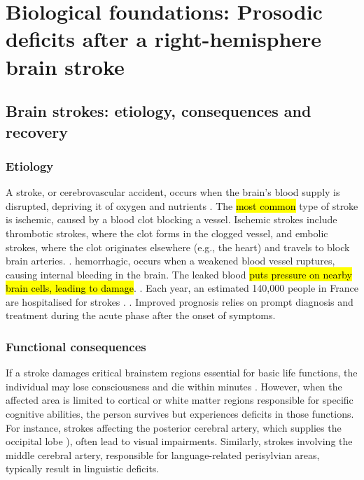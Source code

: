 \renewcommand{\chaptername}{Chapter}
\chapter{Biological foundations: Prosodic deficits after a right-hemisphere brain stroke}\label{chap2}


\section {Brain strokes: etiology, consequences and recovery}

\subsection{Etiology}

A stroke, or cerebrovascular accident, occurs when the brain's blood supply is disrupted, depriving it of oxygen and nutrients . The \hl{most common} type of stroke is ischemic, caused by a blood clot blocking a vessel. Ischemic strokes include thrombotic strokes, where the clot forms in the clogged vessel, and embolic strokes, where the clot originates elsewhere (e.g., the heart) and travels to block brain arteries. .  hemorrhagic, occurs when a weakened blood vessel ruptures, causing internal bleeding in the brain. The leaked blood \hl{puts pressure on nearby brain cells, leading to damage}.  \cite{kemmerer_cognitive_nodate}. Each year, an estimated 140,000 people in France are hospitalised for strokes \cite{lecoffre_laccident_nodate}. .  Improved prognosis relies on prompt diagnosis and treatment during the acute phase after the onset of symptoms.

\subsection{Functional consequences} 

If a stroke damages critical brainstem regions essential for basic life functions, the individual may lose consciousness and die within minutes . However, when the affected area is limited to cortical or white matter regions responsible for specific cognitive abilities, the person  survives but  experiences deficits in those functions. For instance, strokes affecting the posterior cerebral artery, which supplies the occipital lobe ), often lead to visual impairments. Similarly, strokes involving the middle cerebral artery, responsible for language-related perisylvian areas, typically result in linguistic deficits. \cite{kemmerer_cognitive_nodate}

